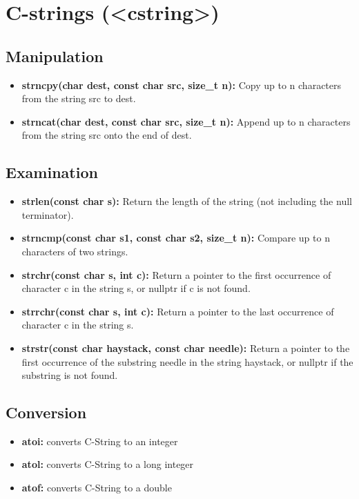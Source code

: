 \documentclass{report}
\begin{document}
    \pagebreak \bigbreak \noindent 
    \section{\LARGE C-strings (<cstring>)}
    \bigbreak \noindent 
    \subsection{Manipulation}
    \begin{itemize}
        \item \textbf{strncpy(char dest, const char src, size\_t n):} Copy up to n characters from the string src to dest.
        \item \textbf{strncat(char dest, const char src, size\_t n):} Append up to n characters from the string src onto the end of dest.
    \end{itemize}

    \bigbreak \noindent 
    \subsection{Examination}
    \begin{itemize}
        \item \textbf{strlen(const char s):} Return the length of the string (not including the null terminator).
        \item \textbf{strncmp(const char s1, const char s2, size\_t n):} Compare up to n characters of two strings.
        \item \textbf{strchr(const char s, int c):} Return a pointer to the first occurrence of character c in the string s, or nullptr if c is not found.
        \item \textbf{strrchr(const char s, int c):} Return a pointer to the last occurrence of character c in the string s.
        \item \textbf{strstr(const char haystack, const char needle):} Return a pointer to the first occurrence of the substring needle in the string haystack, or nullptr if the substring is not found.
    \end{itemize}

    \bigbreak \noindent 
    \subsection{Conversion}
    \begin{itemize}
        \item \textbf{atoi:} converts C-String to an integer 
        \item \textbf{atol:} converts C-String to a long integer 
        \item \textbf{atof:} converts C-String to a double
    \end{itemize}
\end{document}
